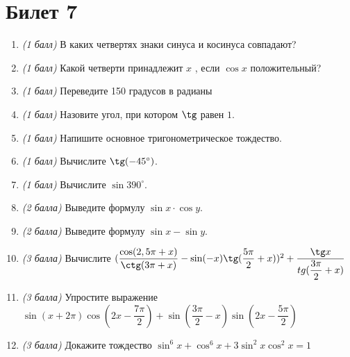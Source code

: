 \documentclass[12pt, a4paper]{article}
\begin{document}
\section*{Билет 7}
\begin{enumerate}
\item \textit{(1 балл)}	В каких четвертях знаки синуса и косинуса совпадают? 
\item \textit{(1 балл)}	Какой четверти принадлежит $x$ , если $\cos x$ положительный?
\item \textit{(1 балл)}	Переведите 150 градусов в радианы
\item \textit{(1 балл)}	Назовите угол, при котором $\tg$  равен $1$.
\item \textit{(1 балл)}	Напишите основное тригонометрическое тождество.
\item \textit{(1 балл)} Вычислите $\tg (-45^{\circ})$.
\item \textit{(1 балл)}	Вычислите $\sin 390^{\circ}$.
\item \textit{(2 балла)} Выведите формулу $\sin x \cdot \cos y$.
\item \textit{(2 балла)} Выведите формулу $\sin x - \sin y$.
\item \textit{(3 балла)} Вычислите $(\dfrac{\cos (2,5\pi + x)}{\ctg (3\pi + x)} - \sin (-x) \tg (\dfrac{5\pi}{2}+x))^2 + \dfrac{\tg x}{tg (\dfrac{3\pi}{2}+x)}$
\item \textit{(3 балла)} Упростите выражение $\sin (x+2\pi) \cos (2x-\dfrac{7\pi}{2})+ \sin (\dfrac{3\pi}{2}-x) \sin (2x - \dfrac{5\pi}{2})$
\item \textit{(3 балла)} Докажите тождество $\sin^6x + \cos^6x + 3\sin^2x\cos^2x = 1$
\end{enumerate}
\end{document}
